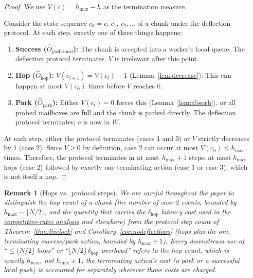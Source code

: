 \documentclass[11pt,a4paper]{article}
\newtheorem{remark}{Remark}[section]
\begin{document}
\begin{proof}
We use $V(c) = h_{\max} - h$ as the termination measure.

\medskip
Consider the state sequence $c_0 = c,\, c_1,\, c_2, \ldots$ of a
chunk under the deflection protocol.  At each step, exactly one of
three things happens:

\begin{enumerate}
  \item \textbf{Success ($\hat{O}_{\text{push-local}}$):}
        The chunk is accepted into a worker's local queue.  The
        deflection protocol terminates.  $V$ is irrelevant after
        this point.

  \item \textbf{Hop ($\hat{O}_{\text{hop}}$):}
        $V(c_{t+1}) = V(c_t) - 1$ (Lemma~\ref{lem:decrease}).
        This can happen at most $V(c_0)$ times before $V$ reaches 0.

  \item \textbf{Park ($\hat{O}_{\text{park}}$):}
        Either $V(c_t) = 0$ forces this (Lemma~\ref{lem:absorb}),
        or all probed mailboxes are full and the chunk is parked
        directly.  The deflection protocol terminates; $c$ is now
        in $W$.
\end{enumerate}

At each step, either the protocol terminates (cases 1 and 3) or
$V$ strictly decreases by 1 (case 2).  Since $V \geq 0$ by
definition, case 2 can occur at most $V(c_0) \leq h_{\max}$ times.
Therefore, the protocol terminates in at most $h_{\max} + 1$ steps:
at most $h_{\max}$ hops (case 2) followed by exactly one terminating
action (case 1 or case 3), which is not itself a hop.
\end{proof}

\begin{remark}[Hops vs.\ protocol steps]
\label{rem:hops-vs-steps}
We are careful throughout the paper to distinguish the \emph{hop count}
of a chunk (the number of case-2 events, bounded by $h_{\max} =
\lfloor N/2\rfloor$, and the quantity that carries the
$\delta_{\mathrm{hop}}$ latency cost used in
\hyperref[chap:competitive_ratio]{the competitive-ratio analysis} and
elsewhere) from the \emph{protocol step count} of
Theorem~\ref{thm:livelock} and Corollary~\ref{cor:nodeflectloop} (hops
\emph{plus} the one terminating success/park action, bounded by
$h_{\max}+1$). Every downstream use of ``$\leq \lfloor N/2\rfloor$
hops'' or ``$\lfloor N/2\rfloor\,\delta_{\mathrm{hop}}$ overhead''
refers to the hop count, which is exactly $h_{\max}$, not $h_{\max}+1$;
the terminating action's cost (a park or a successful local push) is
accounted for separately wherever those costs are charged.
\end{remark}
\end{document}
